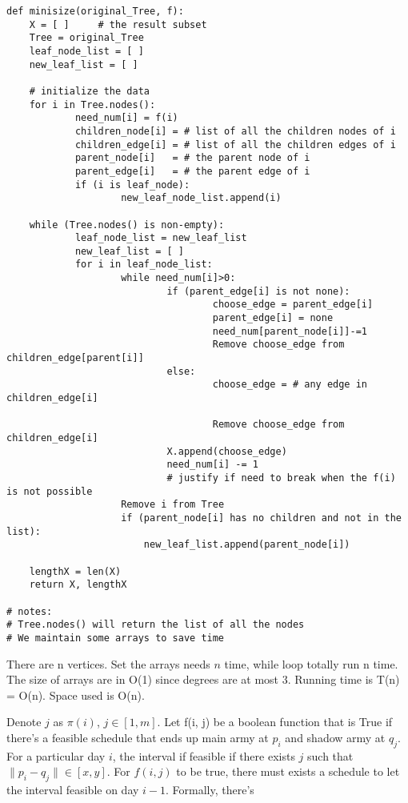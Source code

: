\documentclass[12pt,a4paper]{article}
\newcommand{\question}[1]{\bigskip\noindent{\textbf{Q{#1} solution}}}
\begin{document}
\begin{lstlisting}
def minisize(original_Tree, f):
	X = [ ]		# the result subset
	Tree = original_Tree
	leaf_node_list = [ ]
	new_leaf_list = [ ]

	# initialize the data
	for i in Tree.nodes():
		  	need_num[i] = f(i)
			children_node[i] = # list of all the children nodes of i
			children_edge[i] = # list of all the children edges of i
			parent_node[i]   = # the parent node of i
			parent_edge[i]   = # the parent edge of i
			if (i is leaf_node):
					new_leaf_node_list.append(i)

	while (Tree.nodes() is non-empty):
			leaf_node_list = new_leaf_list
			new_leaf_list = [ ]
			for i in leaf_node_list:  
					while need_num[i]>0:
							if (parent_edge[i] is not none):
									choose_edge = parent_edge[i]
									parent_edge[i] = none
									need_num[parent_node[i]]-=1
									Remove choose_edge from children_edge[parent[i]] 
							else:
									choose_edge = # any edge in children_edge[i]

							    	Remove choose_edge from children_edge[i]
							X.append(choose_edge)
							need_num[i] -= 1
							# justify if need to break when the f(i) is not possible
					Remove i from Tree
					if (parent_node[i] has no children and not in the list):
						new_leaf_list.append(parent_node[i])
			
	lengthX = len(X)
	return X, lengthX

# notes:
# Tree.nodes() will return the list of all the nodes
# We maintain some arrays to save time

\end{lstlisting}
There are n vertices. Set the arrays needs $n$ time, while loop totally run n time. The size of arrays are in O(1) since degrees are at most 3. Running time is T(n) = O(n). Space used is O(n).\\

\question{21.A}

Denote $j$ as $\pi(i)$, $j \in [1,m]$. Let f(i, j) be a boolean function that is True if there's a feasible schedule that ends up main army at $p_i$ and shadow army at $q_j$. For a particular day $i$, the interval if feasible if there exists $j$ such that $\|p_i - q_j\| \in [x,y]$. For $f(i,j)$ to be true, there must exists a schedule to let the interval feasible on day $i - 1$. Formally, there's 
\end{document}

